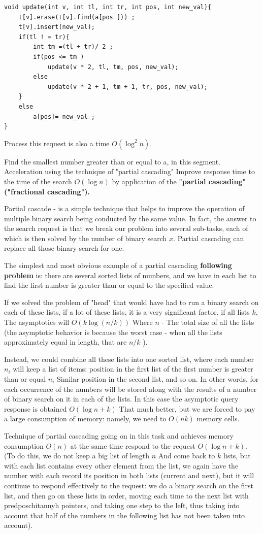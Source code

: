 \begin{verbatim}
void update(int v, int tl, int tr, int pos, int new_val){
    t[v].erase(t[v].find(a[pos ])) ;
    t[v].insert(new_val);
    if(tl ! = tr){
        int tm =(tl + tr)/ 2 ;
        if(pos <= tm )
            update(v * 2, tl, tm, pos, new_val);
        else
            update(v * 2 + 1, tm + 1, tr, pos, new_val);
    }
    else
        a[pos]= new_val ;
} 
\end{verbatim}
Process this request is also a time $O (\log ^ 2 n)$.

Find the smallest number greater than or equal to a, in this segment. Acceleration using the technique of "partial cascading"
Improve response time to the time of the search $O (\log n)$ by application of the \textbf{"partial cascading" ("fractional cascading").}

Partial cascade - is a simple technique that helps to improve the operation of multiple binary search being conducted by the same value. In fact, the answer to the search request is that we break our problem into several sub-tasks, each of which is then solved by the number of binary search $x$. Partial cascading can replace all those binary search for one.

The simplest and most obvious example of a partial cascading \textbf{following problem} is: there are several sorted lists of numbers, and we have in each list to find the first number is greater than or equal to the specified value.

If we solved the problem of "head" that would have had to run a binary search on each of these lists, if a lot of these lists, it is a very significant factor, if all lists $k$, The asymptotics will $O (k \log (n / k))$ Where $n$ - The total size of all the lists (the asymptotic behavior is because the worst case - when all the lists approximately equal in length, that are $n / k$ ).

Instead, we could combine all these lists into one sorted list, where each number $n_i$ will keep a list of items: position in the first list of the first number is greater than or equal $n_i$ Similar position in the second list, and so on. In other words, for each occurrence of the numbers will be stored along with the results of a number of binary search on it in each of the lists. In this case the asymptotic query response is obtained $O (\log n + k)$ That much better, but we are forced to pay a large consumption of memory: namely, we need to $O (nk)$ memory cells.

Technique of partial cascading going on in this task and achieves memory consumption $O (n)$ at the same time respond to the request $O (\log n + k)$. (To do this, we do not keep a big list of length $n$ And come back to $k$ lists, but with each list contains every other element from the list, we again have the number with each record its position in both lists (current and next), but it will continue to respond effectively to the request: we do a binary search on the first list, and then go on these lists in order, moving each time to the next list with predposchitannyh pointers, and taking one step to the left, thus taking into account that half of the numbers in the following list has not been taken into account).


